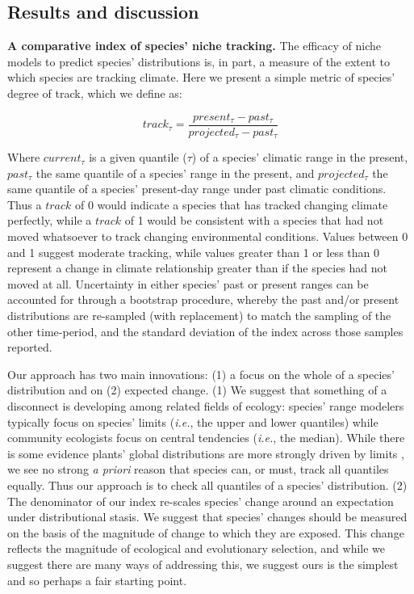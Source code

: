 \documentclass[12pt]{report}
\begin{document}
\subsection*{Results and discussion}
\textbf{A comparative index of species' niche tracking.} The efficacy
of niche models to predict species' distributions is, in part, a
measure of the extent to which species are tracking climate. Here we
present a simple metric of species' degree of track, which we define
as:

\begin{equation}
  track_\tau = \frac{present_\tau - past_\tau}{projected_\tau - past_\tau}
\end{equation}

Where $current_\tau$ is a given quantile ($\tau$) of a species'
climatic range in the present, $past_\tau$ the same quantile of a
species' range in the present, and $projected_\tau$ the same quantile
of a species' present-day range under past climatic conditions. Thus a
$track$ of 0 would indicate a species that has tracked changing
climate perfectly, while a $track$ of 1 would be consistent with a
species that had not moved whatsoever to track changing environmental
conditions. Values between 0 and 1 suggest moderate tracking, while
values greater than 1 or less than 0 represent a change in climate
relationship greater than if the species had not moved at
all. Uncertainty in either species' past or present ranges can be
accounted for through a bootstrap procedure, whereby the past and/or
present distributions are re-sampled (with replacement) to match the
sampling of the other time-period, and the standard deviation of the
index across those samples reported.

Our approach has two main innovations: (1) a focus on the whole of a
species' distribution and on (2) expected change. (1) We suggest that
something of a disconnect is developing among related fields of
ecology: species' range modelers typically focus on species'
limits\supercite{xxx} (\emph{i.e.}, the upper and lower quantiles)
while community ecologists focus on central tendencies\supercite{xxx}
(\emph{i.e.}, the median). While there is some evidence plants' global
distributions are more strongly driven by limits
\supercite{Zanne2018}, we see no strong \emph{a priori} reason that
species can, or must, track all quantiles equally\supercite{xxx}. Thus
our approach is to check all quantiles of a species' distribution. (2)
The denominator of our index re-scales species' change around an
expectation under distributional stasis. We suggest that species'
changes should be measured on the basis of the magnitude of change to
which they are exposed. This change reflects the magnitude of
ecological and evolutionary selection, and while we suggest there are
many ways of addressing this, we suggest ours is the simplest and so
perhaps a fair starting point.
\end{document}
